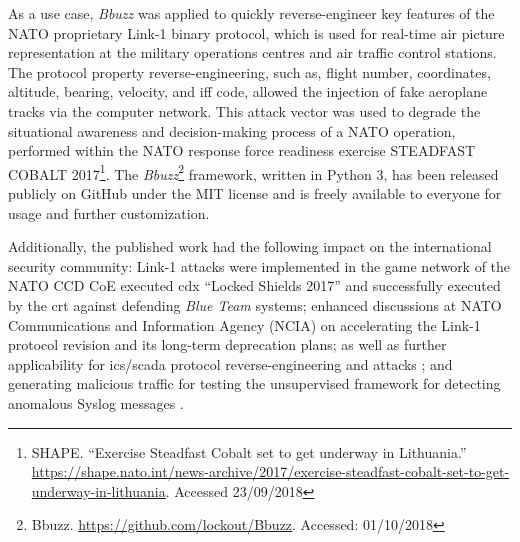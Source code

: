 As a use case, \textit{Bbuzz} was applied to quickly reverse-engineer key features of the NATO proprietary Link-1 binary protocol, which is used for real-time air picture representation at the military operations centres and air traffic control stations. The protocol property reverse-engineering, such as, flight number, coordinates, altitude, bearing, velocity, and \gls{iff} code, allowed the injection of fake aeroplane tracks via the computer network. This attack vector was used to degrade the situational awareness and decision-making process of a NATO operation, performed within the NATO response force readiness exercise STEADFAST COBALT 2017\footnote{SHAPE. ``Exercise Steadfast Cobalt set to get underway in Lithuania.'' \url{https://shape.nato.int/news-archive/2017/exercise-steadfast-cobalt-set-to-get-underway-in-lithuania}. Accessed 23/09/2018}.
The \textit{Bbuzz}\footnote{Bbuzz. \url{https://github.com/lockout/Bbuzz}. Accessed: 01/10/2018} framework, written in Python 3, has been released publicly on GitHub under the MIT license and is freely available to everyone for usage and further customization.

Additionally, the published work had the following impact on the international security community:
Link-1 attacks were implemented in the game network of the NATO CCD CoE executed \gls{cdx} ``Locked Shields 2017'' and successfully executed by the \gls{crt} against defending \textit{Blue Team} systems;
enhanced discussions at NATO Communications and Information Agency (NCIA) on accelerating the Link-1 protocol revision and its long-term deprecation plans;
as well as further applicability for \gls{ics}/\gls{scada} protocol reverse-engineering and attacks \cite{Blumbergs2018};
and generating malicious traffic for testing the unsupervised framework for detecting anomalous Syslog messages \cite{Vaarandi2018}.

